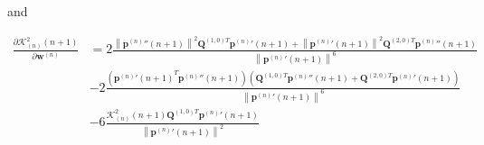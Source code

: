 and

\begin{equation}\label{eq:curvature:der:K2nn1}
\begin{split}
\frac{
\partial 
\mathcal{K}_{(n)}^{2}(n+1)
}
{
\partial \mathbf{w}^{(n)}
}
& = 
2
\frac{
\left\|{\mathbf{p}^{(n)}}''(n+1)\right\|^2
\mathbf{Q}^{(1,0)T} {\mathbf{p}^{(n)}}'(n+1)
+
\left\|{\mathbf{p}^{(n)}}'(n+1)\right\|^2
\mathbf{Q}^{(2,0)T} {\mathbf{p}^{(n)}}''(n+1)
}
{\left\| {\mathbf{p}^{(n)}}'(n+1) \right\|^{6}}\\[10pt]
& - 
2
\frac
{
\left(
{{\mathbf{p}^{(n)}}'(n+1)}^{T}
{\mathbf{p}^{(n)}}''(n+1)
\right)
\left(
\mathbf{Q}^{(1,0)T}{\mathbf{p}^{(n)}}''(n+1)
+
\mathbf{Q}^{(2,0)T}{\mathbf{p}^{(n)}}'(n+1)
\right)
}
{\left\| {\mathbf{p}^{(n)}}'(n+1) \right\|^{6}}\\[10pt]
& - 
6
\frac
{
\mathcal{K}_{(n)}^{2}(n+1)
\mathbf{Q}^{(1,0)T}{\mathbf{p}^{(n)}}'(n+1)
}
{\left\| {\mathbf{p}^{(n)}}'(n+1) \right\|^{2}}
\end{split}
\end{equation}

\begin{comment}
Finally

\begin{equation}
\frac{
\partial 
\mathcal{K}_{(n)}^{2}(n+1)
}
{
\partial \mathbf{w}^{(n)}
}
\end{equation}
\end{comment}
